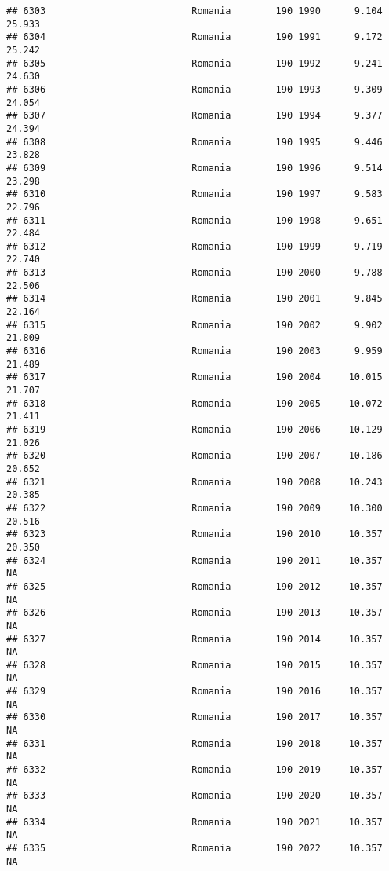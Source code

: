 \documentclass[
]{article}
\begin{document}
\begin{verbatim}
## 6303                          Romania        190 1990      9.104     25.933
## 6304                          Romania        190 1991      9.172     25.242
## 6305                          Romania        190 1992      9.241     24.630
## 6306                          Romania        190 1993      9.309     24.054
## 6307                          Romania        190 1994      9.377     24.394
## 6308                          Romania        190 1995      9.446     23.828
## 6309                          Romania        190 1996      9.514     23.298
## 6310                          Romania        190 1997      9.583     22.796
## 6311                          Romania        190 1998      9.651     22.484
## 6312                          Romania        190 1999      9.719     22.740
## 6313                          Romania        190 2000      9.788     22.506
## 6314                          Romania        190 2001      9.845     22.164
## 6315                          Romania        190 2002      9.902     21.809
## 6316                          Romania        190 2003      9.959     21.489
## 6317                          Romania        190 2004     10.015     21.707
## 6318                          Romania        190 2005     10.072     21.411
## 6319                          Romania        190 2006     10.129     21.026
## 6320                          Romania        190 2007     10.186     20.652
## 6321                          Romania        190 2008     10.243     20.385
## 6322                          Romania        190 2009     10.300     20.516
## 6323                          Romania        190 2010     10.357     20.350
## 6324                          Romania        190 2011     10.357         NA
## 6325                          Romania        190 2012     10.357         NA
## 6326                          Romania        190 2013     10.357         NA
## 6327                          Romania        190 2014     10.357         NA
## 6328                          Romania        190 2015     10.357         NA
## 6329                          Romania        190 2016     10.357         NA
## 6330                          Romania        190 2017     10.357         NA
## 6331                          Romania        190 2018     10.357         NA
## 6332                          Romania        190 2019     10.357         NA
## 6333                          Romania        190 2020     10.357         NA
## 6334                          Romania        190 2021     10.357         NA
## 6335                          Romania        190 2022     10.357         NA

\end{verbatim}
\end{document}
